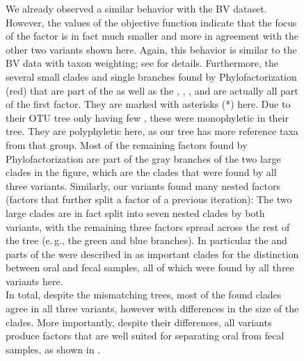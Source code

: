 \begin{figure}[!htb]
{        We already observed a similar behavior with the \ac{BV} dataset. %
        However, the values of the objective function indicate that the focus of the factor is in fact much smaller
        and more in agreement with the other two variants shown here.
        Again, this behavior is similar to the \ac{BV} data with taxon weighting;
        see  for details.
        Furthermore, the several small clades and single branches found by Phylofactorization (red)
        that are part of the  as well as the , ,
        , and  are actually all part of the first factor.
        They are marked with asterisks (*) here.
        Due to their OTU tree only having few , these were monophyletic in their tree.
        They are polyphyletic here, as our tree has more reference taxa from that group.
        Most of the remaining factors found by Phylofactorization are part of the gray branches
        of the two large clades in the figure,
        which are the clades that were found by all three variants.
        Similarly, our variants found many nested factors (factors that further split a factor of a previous iteration):
        The two large clades are in fact split into seven nested clades by both variants,
        with the remaining three factors spread across the rest of the tree (e.\,g., the green and blue branches).
        In particular the  and parts of the 
        were described in \cite{Washburne2017a} as important clades for the distinction between oral and fecal samples,
        all of which were found by all three variants here.
        \\
        In total, despite the mismatching trees, most of the found clades agree in all three variants,
        however with differences in the size of the clades.
        More importantly, despite their differences,
        all variants produce factors that are well suited for separating oral from fecal samples,
        as shown in .
    }
    \label{fig:multi_factors_tree}
\end{figure}


